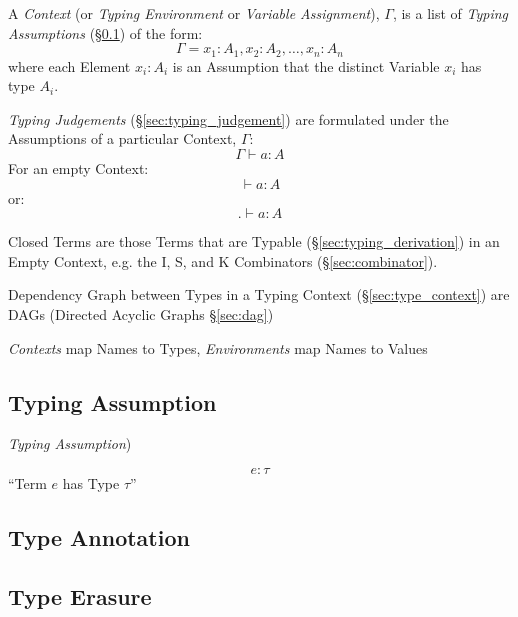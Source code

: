 A \emph{Context} (or \emph{Typing Environment} or \emph{Variable
  Assignment}), $\Gamma$, is a list of \emph{Typing Assumptions}
(\S\ref{sec:typing_assumption}) of the form:
\[
  \Gamma = x_1 : A_1, x_2 : A_2, \ldots, x_n : A_n
\]
where each Element $x_i : A_i$ is an Assumption that the distinct
Variable $x_i$ has type $A_i$.

\emph{Typing Judgements} (\S\ref{sec:typing_judgement}) are formulated
under the Assumptions of a particular Context, $\Gamma$:
\[
  \Gamma \vdash a : A
\]
For an empty Context:
\[
  \vdash a : A
\]
or:
\[
  . \vdash a : A
\]

Closed Terms are those Terms that are Typable
(\S\ref{sec:typing_derivation}) in an Empty Context, e.g. the I, S,
and K Combinators (\S\ref{sec:combinator}).

Dependency Graph between Types in a Typing Context (\S\ref{sec:type_context})
are DAGs (Directed Acyclic Graphs \S\ref{sec:dag})

\emph{Contexts} map Names to Types, \emph{Environments} map Names to Values



\subsection{Typing Assumption}\label{sec:typing_assumption}

\emph{Typing Assumption})

\[
  e : \tau
\]
``Term $e$ has Type $\tau$''



\subsection{Type Annotation}\label{sec:type_annotation}

\subsection{Type Erasure}\label{sec:type_erasure}

